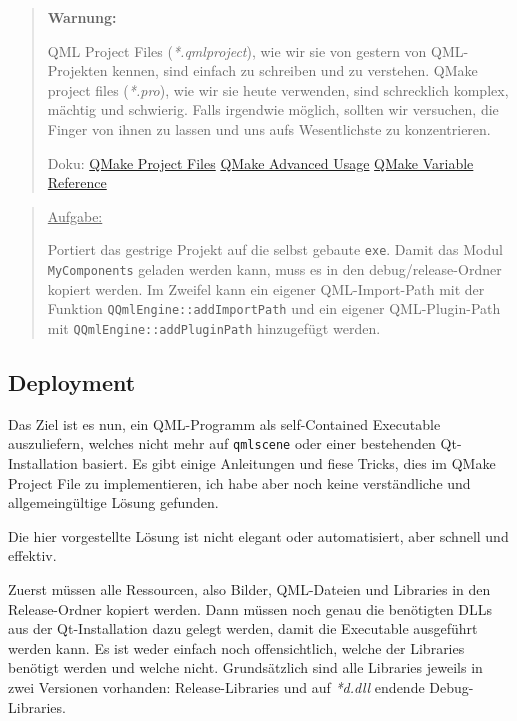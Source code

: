 \documentclass[a4paper]{article}
\begin{document}
\begin{quote}
\textbf{Warnung:}

QML Project Files (\emph{*.qmlproject}), wie wir sie von gestern von QML-Projekten kennen, sind einfach zu schreiben und zu verstehen. QMake project files (\emph{*.pro}), wie wir sie heute verwenden, sind schrecklich komplex, mächtig und schwierig. Falls irgendwie möglich, sollten wir versuchen, die Finger von ihnen zu lassen und uns aufs Wesentlichste zu konzentrieren.

Doku: \href{http://qt-project.org/doc/qt-4.8/qmake-project-files.html}{QMake Project Files} \href{http://qt-project.org/doc/qt-5/qmake-advanced-usage.html}{QMake Advanced Usage} \href{http://qt-project.org/doc/qt-5/qmake-variable-reference.html}{QMake Variable Reference}
\end{quote}

\begin{quote}
\uline{Aufgabe:}

Portiert das gestrige Projekt auf die selbst gebaute \verb~exe~. Damit das Modul \verb~MyComponents~ geladen werden kann, muss es in den debug/release-Ordner kopiert werden. Im Zweifel kann ein eigener QML-Import-Path mit der Funktion \verb~QQmlEngine::addImportPath~ und ein eigener QML-Plugin-Path mit \verb~QQmlEngine::addPluginPath~ hinzugefügt werden.
\end{quote}
\subsection{Deployment}
\label{sec-2-3}
Das Ziel ist es nun, ein QML-Programm als self-Contained Executable auszuliefern, welches nicht mehr auf \verb~qmlscene~ oder einer bestehenden Qt-Installation basiert. Es gibt einige Anleitungen und fiese Tricks, dies im QMake Project File zu implementieren, ich habe aber noch keine verständliche und allgemeingültige Lösung gefunden.

Die hier vorgestellte Lösung ist nicht elegant oder automatisiert, aber schnell und effektiv.

Zuerst müssen alle Ressourcen, also Bilder, QML-Dateien und Libraries in den Release-Ordner kopiert werden. Dann müssen noch genau die benötigten DLLs aus der Qt-Installation dazu gelegt werden, damit die Executable ausgeführt werden kann. Es ist weder einfach noch offensichtlich, welche der Libraries benötigt werden und welche nicht. Grundsätzlich sind alle Libraries jeweils in zwei Versionen vorhanden: Release-Libraries und auf \emph{*d.dll} endende Debug-Libraries.
\end{document}
